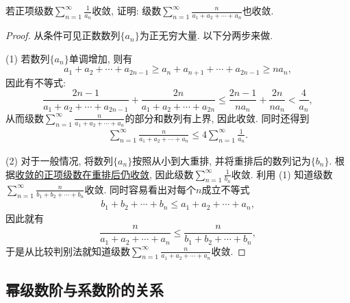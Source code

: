 \documentclass[../../main.tex]{subfiles}
\begin{document}
\begin{example}
若正项级数$\sum\limits_{n=1}^{\infty}\frac{1}{a_n}$收敛, 证明: 级数$\sum\limits_{n=1}^{\infty}\frac{n}{a_1+a_2+\cdots+a_n}$也收敛.
\end{example}
\begin{proof}
从条件可见正数数列$\{a_n\}$为正无穷大量. 以下分两步来做.

(1) 若数列$\{a_n\}$单调增加, 则有
$$a_1+a_2+\cdots+a_{2n-1}\geqslant a_n+a_{n+1}+\cdots+a_{2n-1}\geqslant na_n,$$
因此有不等式:
$$\frac{2n-1}{a_1+a_2+\cdots+a_{2n-1}}+\frac{2n}{a_1+a_2+\cdots+a_{2n}}\leqslant \frac{2n-1}{na_n}+\frac{2n}{na_n}<\frac{4}{a_n},$$
从而级数$\sum\limits_{n=1}^{\infty}\frac{n}{a_1+a_2+\cdots+a_n}$的部分和数列有上界, 因此收敛. 同时还得到
\begin{align*}
\sum_{n=1}^{\infty}\frac{n}{a_1+a_2+\cdots+a_n}\leqslant 4\sum_{n=1}^{\infty}\frac{1}{a_n}.
\end{align*}

(2) 对于一般情况, 将数列$\{a_n\}$按照从小到大重排, 并将重排后的数列记为$\{b_n\}$. 根据\hyperref[theorem:Riemann重排定理]{收敛的正项级数在重排后仍收敛}, 因此级数$\sum\limits_{n=1}^{\infty}\frac{1}{b_n}$收敛. 利用 (1) 知道级数$\sum\limits_{n=1}^{\infty}\frac{n}{b_1+b_2+\cdots+b_n}$收敛. 同时容易看出对每个$n$成立不等式
\begin{align*}
b_1+b_2+\cdots+b_n\leqslant a_1+a_2+\cdots+a_n,
\end{align*}
因此就有
$$\frac{n}{a_1+a_2+\cdots+a_n}\leqslant \frac{n}{b_1+b_2+\cdots+b_n},$$
于是从比较判别法就知道级数$\sum\limits_{n=1}^{\infty}\frac{n}{a_1+a_2+\cdots+a_n}$收敛.
\end{proof}



\subsection{幂级数阶与系数阶的关系}
\end{document}
